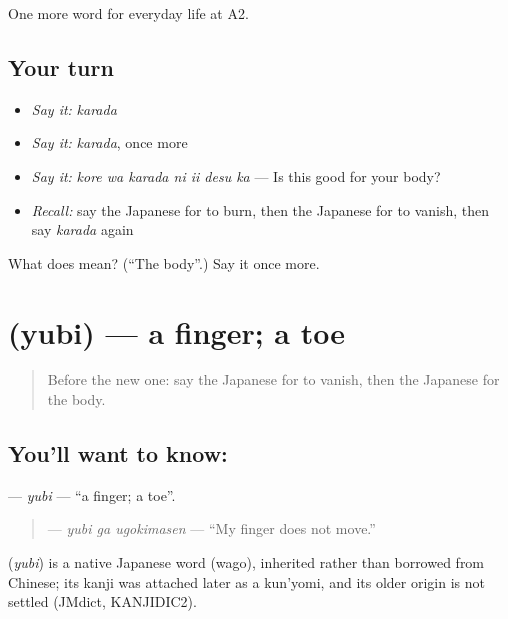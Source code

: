\begin{grammarlens}[title={What you've built}]
One more word for everyday life at A2.
\end{grammarlens}

\subsection*{Your turn}
\begin{itemize}
\raggedright
  \item \emph{Say it:} \emph{karada}
  \item \emph{Say it:} \emph{karada}, once more
  \item \emph{Say it:} \emph{kore wa karada ni ii desu ka} — Is this good for your body?
  \item \emph{Recall:} say the Japanese for to burn, then the Japanese for to vanish, then say \emph{karada} again
\end{itemize}

\begin{tcolorbox}[breakable,colback=teal!4,colframe=teal!35!black,title={Before you move on}]
What does  mean? (\textquotedblleft{}The body\textquotedblright{}.) Say it once more.
\end{tcolorbox}
\section[\texorpdfstring{\ja{ゆび} (yubi)}{ゆび (yubi)}]{ (yubi) — a finger; a toe}

\label{lesson:JA-C215-yubi}



\begin{quote}
Before the new one: say the Japanese for to vanish, then the Japanese for the body.
\end{quote}

\subsection*{You'll want to know: }
\textbf{} — \emph{yubi} — \textquotedblleft{}a finger; a toe\textquotedblright{}.

\begin{quote}
\textbf{ } — \emph{yubi ga ugokimasen} — \textquotedblleft{}My finger does not move.\textquotedblright{}
\end{quote}

\begin{cousinweb}
\textbf{} (\emph{yubi}) is a native Japanese word (wago), inherited rather than borrowed from Chinese; its kanji was attached later as a kun'yomi, and its older origin is not settled (JMdict, KANJIDIC2).
\end{cousinweb}

